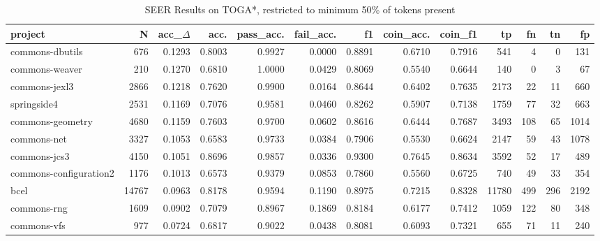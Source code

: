 \begin{table*}
\centering
\caption{SEER Results on TOGA*, restricted to minimum 50\% of tokens present}
\label{tab:toga_results_50}
\begin{tabular}{lrrrrrrrrrrrr}
\toprule
                project &       N &  acc\_$\Delta$ &    acc. &  pass\_acc. &  fail\_acc. &      f1 &  coin\_acc. &  coin\_f1 &      tp &    fn &   tn &     fp \\
\midrule
        commons-dbutils &     676 &      0.1293 &  0.8003 &     0.9927 &     0.0000 &  0.8891 &     0.6710 &   0.7916 &     541 &     4 &    0 &    131 \\
         commons-weaver &     210 &      0.1270 &  0.6810 &     1.0000 &     0.0429 &  0.8069 &     0.5540 &   0.6644 &     140 &     0 &    3 &     67 \\
          commons-jexl3 &    2866 &      0.1218 &  0.7620 &     0.9900 &     0.0164 &  0.8644 &     0.6402 &   0.7635 &    2173 &    22 &   11 &    660 \\
            springside4 &    2531 &      0.1169 &  0.7076 &     0.9581 &     0.0460 &  0.8262 &     0.5907 &   0.7138 &    1759 &    77 &   32 &    663 \\
       commons-geometry &    4680 &      0.1159 &  0.7603 &     0.9700 &     0.0602 &  0.8616 &     0.6444 &   0.7687 &    3493 &   108 &   65 &   1014 \\
            commons-net &    3327 &      0.1053 &  0.6583 &     0.9733 &     0.0384 &  0.7906 &     0.5530 &   0.6624 &    2147 &    59 &   43 &   1078 \\
           commons-jcs3 &    4150 &      0.1051 &  0.8696 &     0.9857 &     0.0336 &  0.9300 &     0.7645 &   0.8634 &    3592 &    52 &   17 &    489 \\
 commons-configuration2 &    1176 &      0.1013 &  0.6573 &     0.9379 &     0.0853 &  0.7860 &     0.5560 &   0.6725 &     740 &    49 &   33 &    354 \\
                   bcel &   14767 &      0.0963 &  0.8178 &     0.9594 &     0.1190 &  0.8975 &     0.7215 &   0.8328 &   11780 &   499 &  296 &   2192 \\
            commons-rng &    1609 &      0.0902 &  0.7079 &     0.8967 &     0.1869 &  0.8184 &     0.6177 &   0.7412 &    1059 &   122 &   80 &    348 \\
            commons-vfs &     977 &      0.0724 &  0.6817 &     0.9022 &     0.0438 &  0.8081 &     0.6093 &   0.7321 &     655 &    71 &   11 &    240 \\

\end{tabular}
\end{table*}

